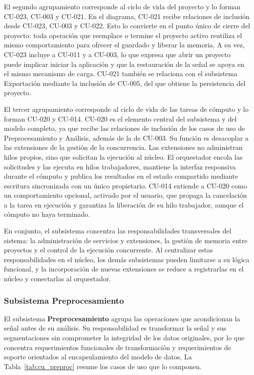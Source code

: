 \documentclass[11pt,a4paper]{article}
\DeclareRobustCommand{\_}{\textunderscore\allowbreak}
\begin{document}
El segundo agrupamiento corresponde al ciclo de vida del proyecto y lo forman CU-023, CU-003 y CU-021. En el diagrama, CU-021 recibe relaciones de inclusi\'on desde CU-023, CU-003 y CU-022. Esto lo convierte en el punto \'unico de cierre del proyecto: toda operaci\'on que reemplace o termine el proyecto activo reutiliza el mismo comportamiento para ofrecer el guardado y liberar la memoria. A su vez, CU-023 incluye a CU-011 y a CU-003, lo que expresa que abrir un proyecto puede implicar iniciar la aplicaci\'on y que la restauraci\'on de la se\~nal se apoya en el mismo mecanismo de carga. CU-021 tambi\'en se relaciona con el subsistema Exportaci\'on mediante la inclusi\'on de CU-005, del que obtiene la persistencia del proyecto.

El tercer agrupamiento corresponde al ciclo de vida de las tareas de c\'omputo y lo forman CU-020 y CU-014. CU-020 es el elemento central del subsistema y del modelo completo, ya que recibe las relaciones de inclusi\'on de los casos de uso de Preprocesamiento y An\'alisis, adem\'as de la de CU-003. Su funci\'on es desacoplar a las extensiones de la gesti\'on de la concurrencia. Las extensiones no administran hilos propios, sino que solicitan la ejecuci\'on al n\'ucleo. El orquestador encola las solicitudes y las ejecuta en hilos trabajadores, mantiene la interfaz responsiva durante el c\'omputo y publica los resultados en el estado compartido mediante escritura sincronizada con un \'unico propietario. CU-014 extiende a CU-020 como un comportamiento opcional, activado por el usuario, que propaga la cancelaci\'on a la tarea en ejecuci\'on y garantiza la liberaci\'on de su hilo trabajador, aunque el c\'omputo no haya terminado.

En conjunto, el subsistema concentra las responsabilidades transversales del sistema: la administraci\'on de servicios y extensiones, la gesti\'on de memoria entre proyectos y el control de la ejecuci\'on concurrente. Al centralizar estas responsabilidades en el n\'ucleo, los dem\'as subsistemas pueden limitarse a su l\'ogica funcional, y la incorporaci\'on de nuevas extensiones se reduce a registrarlas en el n\'ucleo y conectarlas al orquestador.

\subsubsection{Subsistema Preprocesamiento}

El subsistema \textbf{Preprocesamiento} agrupa las operaciones que acondicionan la se\~nal antes de su an\'alisis. Su responsabilidad es transformar la se\~nal y sus segmentaciones sin comprometer la integridad de los datos originales, por lo que concentra requerimientos funcionales de transformaci\'on y requerimientos de soporte orientados al encapsulamiento del modelo de datos. La Tabla~\ref{tab:cu_preproc} resume los casos de uso que lo componen.
\end{document}
